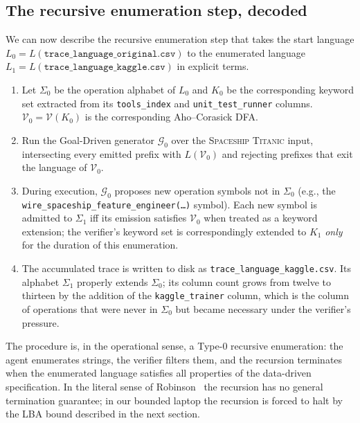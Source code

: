 \subsection{The recursive enumeration step, decoded}

We can now describe the recursive enumeration step that takes
the start language $L_0 =
L(\texttt{trace\_language\_original.csv})$ to the enumerated
language $L_1 = L(\texttt{trace\_language\_kaggle.csv})$ in
explicit terms.

\begin{enumerate}
\item Let $\Sigma_0$ be the operation alphabet of $L_0$ and
$K_0$ be the corresponding keyword set extracted from its
\texttt{tools\_index} and \texttt{unit\_test\_runner} columns.
$\mathcal{V}_0 = \mathcal{V}(K_0)$ is the corresponding
Aho--Corasick DFA.
\item Run the Goal-Driven generator $\mathcal{G}_0$ over the
\textsc{Spaceship Titanic} input, intersecting every emitted
prefix with $L(\mathcal{V}_0)$ and rejecting prefixes that
exit the language of $\mathcal{V}_0$.
\item During execution, $\mathcal{G}_0$ proposes new operation
symbols not in $\Sigma_0$ (e.g., the
\texttt{wire\_spaceship\_feature\_engineer(\dots)} symbol). Each
new symbol is admitted to $\Sigma_1$ iff its emission satisfies
$\mathcal{V}_0$ when treated as a keyword extension; the
verifier's keyword set is correspondingly extended to $K_1$
\emph{only} for the duration of this enumeration.
\item The accumulated trace is written to disk as
\texttt{trace\_language\_kaggle.csv}.  Its alphabet $\Sigma_1$
properly extends $\Sigma_0$; its column count grows from twelve to
thirteen by the addition of the \texttt{kaggle\_trainer} column,
which is the column of operations that were never in
$\Sigma_0$ but became necessary under the verifier's pressure.
\end{enumerate}

The procedure is, in the operational sense, a Type-0 recursive
enumeration: the agent enumerates strings, the verifier filters
them, and the recursion terminates when the enumerated language
satisfies all properties of the data-driven specification.  In
the literal sense of
Robinson~\cite{robinson1949definability,davis1961decision} the
recursion has no general termination guarantee; in our bounded
laptop the recursion is forced to halt by the LBA bound described
in the next section.
